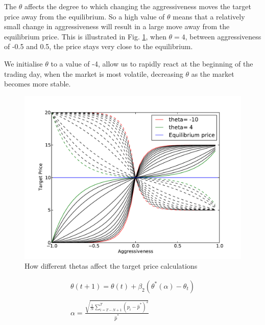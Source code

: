 \documentclass[preprint]{acm_proc_article-sp} %
\begin{document}
The $\theta$ affects the degree to which changing the aggressiveness moves the
target price  away from the equilibrium. So a high value of $\theta$ means that a
relatively small change in aggressiveness will result in a large move away from
the equilibrium price. This is illustrated in Fig. \ref{fig:theta}, when
$\theta=4$, between aggressiveness of -0.5 and 0.5, the price stays very close
to the equilibrium.

We initialise $\theta$ to a value of -4, allow us to rapidly react at the
beginning of the trading day, when the market is most volatile,
decreasing $\theta$ as the market becomes more stable.

\begin{figure}
  \centering
  \label{fig:theta}
  \includegraphics[width=\columnwidth]{graphs_and_stats/graph_thetas.pdf}
  \caption{How different thetas affect the target price calculations}
\end{figure}


\begin{equation}
\label{eqn:update_theta}
\begin{split}
    \theta(t+1)=\theta(t)+\beta_2(\theta^*(\alpha)-\theta_t)\\\\
    \alpha = \frac{\sqrt{\frac 1 N \sum^T_{i=T-N+1}(p_i-\hat p^*)^2}}{\hat p^*}
\end{split}
\end{equation}
\end{document}
